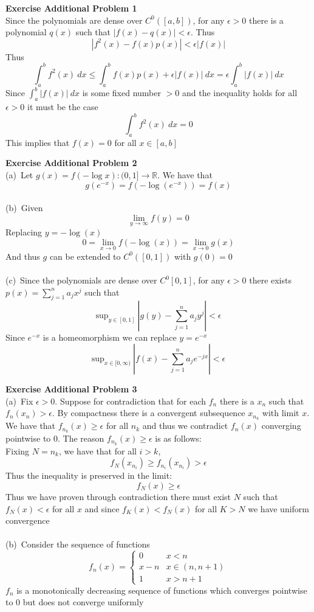 \documentclass[12pt]{article}
\newenvironment{ques}[1]{\textbf{Exercise #1}\vspace{1 mm}\\ }{\bigskip}
\theoremstyle{definition}
\renewcommand{\l}{\left }
\renewcommand{\r}{\right }
\newcommand{\R}{\mathbb R}
\renewcommand{\sup}{\text{sup}}
\begin{document}
\begin{ques}{Additional Problem 1}
	Since the polynomials are dense over $C^0([a,b])$, for any $\epsilon > 0$
	there is a polynomial $q(x)$ such that $|f(x) - q(x)| < \epsilon$. Thus
	$$|f^2(x) - f(x)p(x)| < \epsilon |f(x)| $$
	Thus
	$$\int_a^b f^2(x)\ dx \leq \int_a^b f(x)p(x) + \epsilon |f(x)| \ dx =
	\epsilon\int_a^b |f(x)| \ dx$$
	Since $\int_a^b |f(x)| \ dx$ is some fixed number $>0$ and the inequality
	holds for all $\epsilon >0$ it must be the case
	$$\int_a^b f^2(x)\ dx = 0$$
	This implies that $f(x) = 0$ for all $x \in [a,b]$
\end{ques}

\begin{ques}{Additional Problem 2}
	(a)\ Let $g(x) = f(-\log x ) : (0,1] \to \R$. We have that
	$$g(e^{-x}) = f(-\log(e^{-x})) = f(x)$$
	\\
	(b)\ Given
	$$\lim_{y \to \infty} f(y) = 0$$
	Replacing $y = -\log(x)$ 
	$$0 = \lim_{x \to 0} f(-\log(x)) = \lim_{x \to 0} g(x)$$
	And thus $g$ can be extended to $C^0([0,1])$ with $g(0) = 0$\\
	\\
	(c)\ Since the polynomials are dense over $C^0[0,1]$, for any $\epsilon >
	0$ there exists $p(x) = \sum_{j=1}^n a_jx^j$ such that 
	$$\sup_{y \in [0,1]} \ \l|g(y) - \sum_{j=1}^n a_jy^j\r| < \epsilon$$
	Since $e^{-x}$ is a homeomorphism we can replace $y = e^{-x}$
	$$\sup_{x \in [0,\infty)} \ \l|f(x) - \sum_{j=1}^n a_je^{-jx}\r| < \epsilon$$
\end{ques}

\begin{ques}{Additional Problem 3}
	(a)\ Fix $\epsilon > 0$. Suppose for contradiction that for each $f_n$
	there is a $x_n$ such that $f_n(x_n) > \epsilon$. By compactness there is a
	convergent subsequence $x_{n_k}$ with limit $x$. We have that $f_{n_k}(x) \geq
	\epsilon$ for all $n_k$ and thus we contradict $f_n(x)$ converging
	pointwise to $0$. The reason $f_{n_k}(x) \geq \epsilon$ is as follows:\\
	Fixing $N = n_k$, we have that for all $i > k$, 
	$$f_N(x_{n_i}) \geq f_{n_i}(x_{n_i}) > \epsilon$$
	Thus the inequality is preserved in the limit:
	$$f_N(x) \geq \epsilon$$
	Thus we have proven through contradiction there must exist $N$ such that
	$f_N(x) < \epsilon$ for all $x$ and since $f_K(x) < f_N(x)$ for all $K > N$
	we have uniform convergence\\
	\\
	(b)\ 
	Consider the sequence of functions
	$$f_n(x) = 
	\begin{cases}
	0 & x < n\\
	x- n & x \in (n,n+1)\\
	1 & x > n+1
	\end{cases}
	$$
	$f_n$ is a monotonically decreasing sequence of functions which converges
	pointwise to $0$ but does not converge uniformly
\end{ques}
\end{document}
